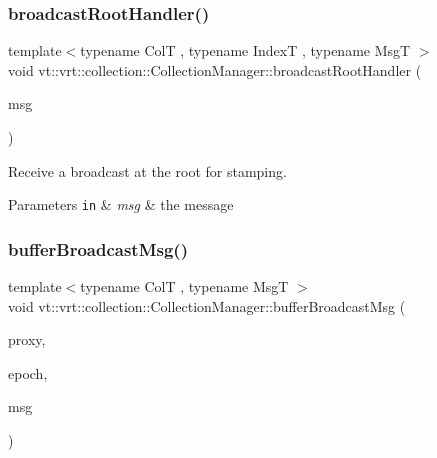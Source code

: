 \subsubsection{\texorpdfstring{broadcast\+Root\+Handler()}{broadcastRootHandler()}}
{\footnotesize\ttfamily template$<$typename ColT , typename IndexT , typename MsgT $>$ \\
void vt\+::vrt\+::collection\+::\+Collection\+Manager\+::broadcast\+Root\+Handler (\begin{DoxyParamCaption}\item[{MsgT $\ast$}]{msg }\end{DoxyParamCaption})\hspace{0.3cm}{\ttfamily [static]}}



Receive a broadcast at the root for stamping. 


\begin{DoxyParams}[1]{Parameters}
\mbox{\tt in}  & {\em msg} & the message \\
\hline
\end{DoxyParams}
\mbox{\label{structvt_1_1vrt_1_1collection_1_1_collection_manager_aba07682da41648437cacd485193063ec}} 
\subsubsection{\texorpdfstring{buffer\+Broadcast\+Msg()}{bufferBroadcastMsg()}}
{\footnotesize\ttfamily template$<$typename ColT , typename MsgT $>$ \\
void vt\+::vrt\+::collection\+::\+Collection\+Manager\+::buffer\+Broadcast\+Msg (\begin{DoxyParamCaption}\item[{\hyperlink{namespacevt_a1b417dd5d684f045bb58a0ede70045ac}{Virtual\+Proxy\+Type} const \&}]{proxy,  }\item[{\hyperlink{namespacevt_a985a5adf291c34a3ca263b3378388236}{Epoch\+Type} const \&}]{epoch,  }\item[{MsgT $\ast$}]{msg }\end{DoxyParamCaption})\hspace{0.3cm}{\ttfamily [private]}}



